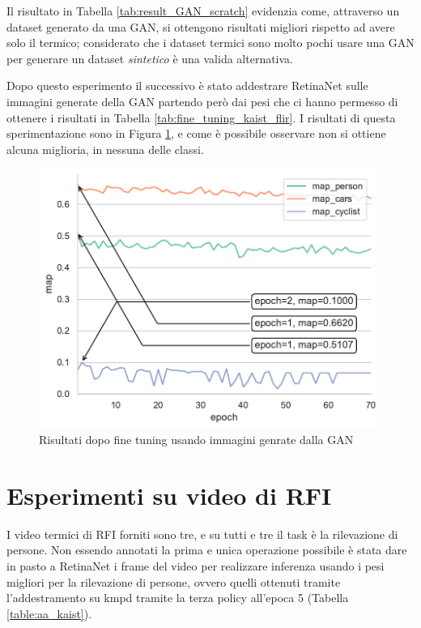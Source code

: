 Il risultato in Tabella \ref{tab:result_GAN_scratch} evidenzia come, attraverso un dataset generato da una \ac{GAN}, si ottengono risultati migliori rispetto ad avere solo il termico; considerato che i dataset termici sono molto pochi usare una \ac{GAN} per generare un dataset \textit{sintetico} è una valida alternativa.

Dopo questo esperimento il successivo è stato addestrare RetinaNet sulle immagini generate della \ac{GAN} partendo però dai pesi che ci hanno permesso di ottenere i risultati in Tabella \ref{tab:fine_tuning_kaist_flir}. I risultati di questa sperimentazione sono in Figura \ref{fig:fine_tuning_gan}, e come è possibile osservare non si ottiene alcuna miglioria, in nessuna delle classi. 
\begin{figure}[]
    \centering
    \includegraphics[width=\textwidth]{images/graphic/graphics_GAN.pdf}
    \caption{Risultati dopo fine tuning usando immagini genrate dalla GAN}
    \label{fig:fine_tuning_gan}
\end{figure}

\section{Esperimenti su video di RFI}
\label{sec:RFI_video_experiment}

I video termici di \ac{RFI} forniti sono tre, e su tutti e tre il task è la rilevazione di persone. Non essendo annotati la prima e unica operazione possibile è stata dare in pasto a RetinaNet i frame del video per realizzare inferenza usando i pesi migliori per la rilevazione di persone, ovvero quelli ottenuti tramite l'addestramento su \ac{kmpd} tramite la terza policy all'epoca 5 (Tabella \ref{table:aa_kaist}). 


